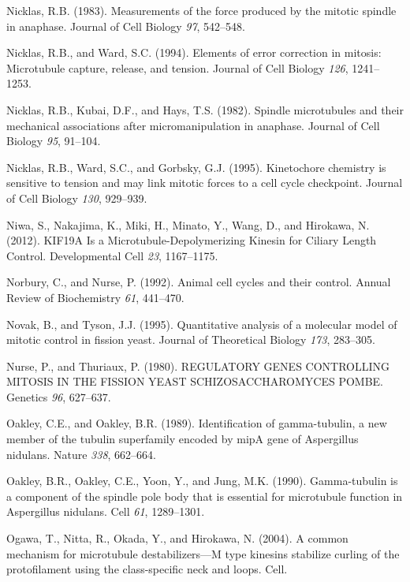 \documentclass[12pt,a4paper,twoside,openright]{book}
\begin{document}
\hypertarget{ref-Nicklas1983}{}
Nicklas, R.B. (1983). Measurements of the force produced by the mitotic
spindle in anaphase. Journal of Cell Biology \emph{97}, 542--548.

\hypertarget{ref-Nicklas1994}{}
Nicklas, R.B., and Ward, S.C. (1994). Elements of error correction in
mitosis: Microtubule capture, release, and tension. Journal of Cell
Biology \emph{126}, 1241--1253.

\hypertarget{ref-Nicklas1982}{}
Nicklas, R.B., Kubai, D.F., and Hays, T.S. (1982). Spindle microtubules
and their mechanical associations after micromanipulation in anaphase.
Journal of Cell Biology \emph{95}, 91--104.

\hypertarget{ref-Nicklas1995}{}
Nicklas, R.B., Ward, S.C., and Gorbsky, G.J. (1995). Kinetochore
chemistry is sensitive to tension and may link mitotic forces to a cell
cycle checkpoint. Journal of Cell Biology \emph{130}, 929--939.

\hypertarget{ref-Niwa2012}{}
Niwa, S., Nakajima, K., Miki, H., Minato, Y., Wang, D., and Hirokawa, N.
(2012). KIF19A Is a Microtubule-Depolymerizing Kinesin for Ciliary
Length Control. Developmental Cell \emph{23}, 1167--1175.

\hypertarget{ref-Norbury1992}{}
Norbury, C., and Nurse, P. (1992). Animal cell cycles and their control.
Annual Review of Biochemistry \emph{61}, 441--470.

\hypertarget{ref-Novak1995}{}
Novak, B., and Tyson, J.J. (1995). Quantitative analysis of a molecular
model of mitotic control in fission yeast. Journal of Theoretical
Biology \emph{173}, 283--305.

\hypertarget{ref-Nurse1980}{}
Nurse, P., and Thuriaux, P. (1980). REGULATORY GENES CONTROLLING MITOSIS
IN THE FISSION YEAST SCHIZOSACCHAROMYCES POMBE. Genetics \emph{96},
627--637.

\hypertarget{ref-Oakley1989}{}
Oakley, C.E., and Oakley, B.R. (1989). Identification of gamma-tubulin,
a new member of the tubulin superfamily encoded by mipA gene of
Aspergillus nidulans. Nature \emph{338}, 662--664.

\hypertarget{ref-Oakley1990}{}
Oakley, B.R., Oakley, C.E., Yoon, Y., and Jung, M.K. (1990).
Gamma-tubulin is a component of the spindle pole body that is essential
for microtubule function in Aspergillus nidulans. Cell \emph{61},
1289--1301.

\hypertarget{ref-Ogawa2004}{}
Ogawa, T., Nitta, R., Okada, Y., and Hirokawa, N. (2004). A common
mechanism for microtubule destabilizers---M type kinesins stabilize
curling of the protofilament using the class-specific neck and loops.
Cell.
\end{document}
